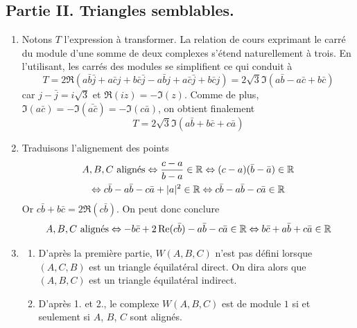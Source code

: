 \subsection*{Partie II. Triangles semblables.}
\begin{enumerate}
 \item Notons $T$ l'expression à transformer. La relation de cours exprimant le carré du module d'une somme de deux complexes s'étend naturellement à trois. En l'utilisant, les carrés des modules se simplifient ce qui conduit à
\begin{displaymath}
 T = 2\Re \left( 
a\bar{b}\bar{j} + a\bar{c}j + b\bar{c}\bar{j} - a\bar{b}j + a\bar{c}\bar{j} + b\bar{c}j   
\right) 
=2\sqrt{3}\Im\left( 
a\bar{b} - a\bar{c} + b\bar{c}
\right) 
\end{displaymath}
car $j-\bar{j}=i\sqrt{3}$ et $\Re(iz)=-\Im(z)$.\newline
Comme de plus, $\Im(a\bar{c})=-\Im(\bar{a\bar{c}}) = -\Im(c\bar{a})$, on obtient finalement
\begin{displaymath}
 T = 2\sqrt{3}\Im\left( a\bar{b} +b\bar{c} + c\bar{a}\right) 
\end{displaymath}

 \item Traduisons l'alignement des points
\begin{multline*}
 A, B, C \text{ alignés} \Leftrightarrow \frac{c-a}{b-a}\in \mathbb{R}
\Leftrightarrow (c-a)(\bar{b}-\bar{a})\in \mathbb{R} \\
\Leftrightarrow c\bar{b} - a\bar{b} -c\bar{a} +|a|^2 \in \mathbb{R}
\Leftrightarrow c\bar{b} - a\bar{b} -c\bar{a} \in \mathbb{R}
\end{multline*}
Or $c\bar{b}+b\bar{c}=2\Re(c\bar{b})$. On peut donc conclure
\begin{displaymath}
 A, B, C \text{ alignés}
 \Leftrightarrow -b\bar{c}+2\operatorname{Re}(c\bar{b}) - a\bar{b} -c\bar{a} \in \mathbb{R}
\Leftrightarrow b\bar{c}+ a\bar{b} +c\bar{a} \in \mathbb{R}
\end{displaymath}

 \item 
\begin{enumerate}
 \item D'après la première partie, $W(A,B,C)$ n'est pas défini lorsque $(A,C,B)$ est un triangle équilatéral direct. On dira alors que $(A,B,C)$ est un triangle équilatéral indirect.
 \item D'après 1. et 2., le complexe $W(A,B,C)$ est de module $1$ si et seulement si $A$, $B$, $C$ sont alignés.
\end{enumerate}


\end{enumerate}
